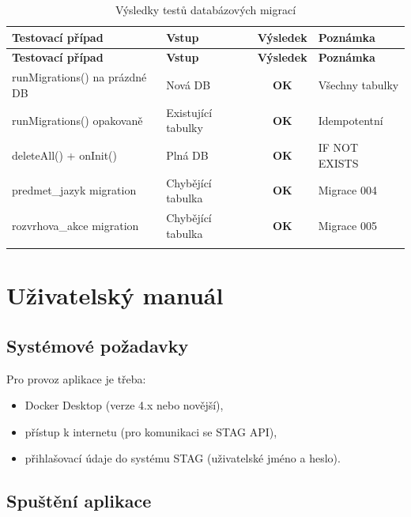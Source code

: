\documentclass[12pt,a4paper]{report}
\begin{document}
\begin{longtable}{p{5cm}p{4cm}cp{2.5cm}}
\toprule
\textbf{Testovací případ} & \textbf{Vstup} & \textbf{Výsledek} & \textbf{Poznámka} \\
\midrule
\endfirsthead
\midrule
\textbf{Testovací případ} & \textbf{Vstup} & \textbf{Výsledek} & \textbf{Poznámka} \\
\midrule
\endhead
runMigrations() na prázdné DB & Nová DB & \textbf{OK} & Všechny tabulky \\
runMigrations() opakovaně & Existující tabulky & \textbf{OK} & Idempotentní \\
deleteAll() + onInit() & Plná DB & \textbf{OK} & IF NOT EXISTS \\
predmet\_jazyk migration & Chybějící tabulka & \textbf{OK} & Migrace 004 \\
rozvrhova\_akce migration & Chybějící tabulka & \textbf{OK} & Migrace 005 \\
\bottomrule
\caption{Výsledky testů databázových migrací}
\end{longtable}

\chapter{Uživatelský manuál}

\section{Systémové požadavky}

Pro provoz aplikace je třeba:
\begin{itemize}
  \item Docker Desktop (verze 4.x nebo novější),
  \item přístup k internetu (pro komunikaci se STAG API),
  \item přihlašovací údaje do systému STAG (uživatelské jméno a heslo).
\end{itemize}

\section{Spuštění aplikace}
\end{document}
